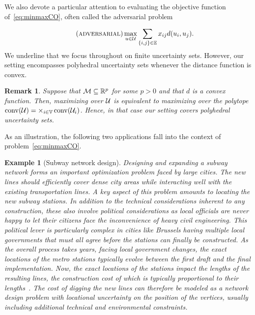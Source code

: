 \documentclass[12pt]{article}
\newtheorem{example}{Example}
\newtheorem{remark}{Remark}
\newcommand{\blue}[1]{{\color{black}#1}}
\begin{document}
We also devote a particular attention to evaluating the objective function of~\ref{eq:minmaxCO}, \blue{often called the adversarial problem}
\blue{
\begin{equation}
\tag{\EVALC}
\label{eq:evalc}
\max_{\u\in\UU}\sum_{\{i,j\}\in \EE}x_{ij} d(u_i,u_j).
\end{equation}
We underline that we focus throughout on finite uncertainty sets. However, our setting encompasses polyhedral uncertainty sets whenever the distance function is convex.
\begin{remark}
\label{rem:convex}
  Suppose that $\mathcal{M}\subseteq \mathbb{R}^p$ for some $p>0$ and that $d$ is a convex function. Then, maximizing over $\mathcal{U}$ is equivalent to maximizing over the polytope $\operatorname*{conv}(\mathcal{U})=\times_{i\in \mathbb{V}}\operatorname*{conv}(\mathcal{U}_i)$. Hence, in that case our setting covers polyhedral uncertainty sets.
\end{remark}
}
As an illustration, the following two applications fall into the context of problem~\ref{eq:minmaxCO}.
\begin{example}[Subway network design] Designing and expanding a subway network forms an important optimization problem faced by large cities. The new lines should efficiently cover dense city areas while interacting well with the existing transportation lines. A key aspect of this problem amounts to locating the new subway stations. In addition to the technical considerations inherent to any construction, these also involve political considerations as local officials are never happy to let their citizens face the inconvenience of heavy civil engineering. This political lever is particularly complex in cities like Brussels having multiple local governments that must all agree before the stations can finally be constructed. As the overall process takes years, facing local government changes, the exact locations of the metro stations typically evolve between the first draft and the final implementation. Now, the exact locations of the stations impact the lengths of the resulting lines, the construction cost of which is typically proportional to their lengths~\citep{GUTIERREZJARPA20133000}. The cost of digging the new lines can therefore be modeled as a network design problem with locational uncertainty on the position of the vertices, usually including additional technical and environmental constraints. %
\end{example}
\end{document}
